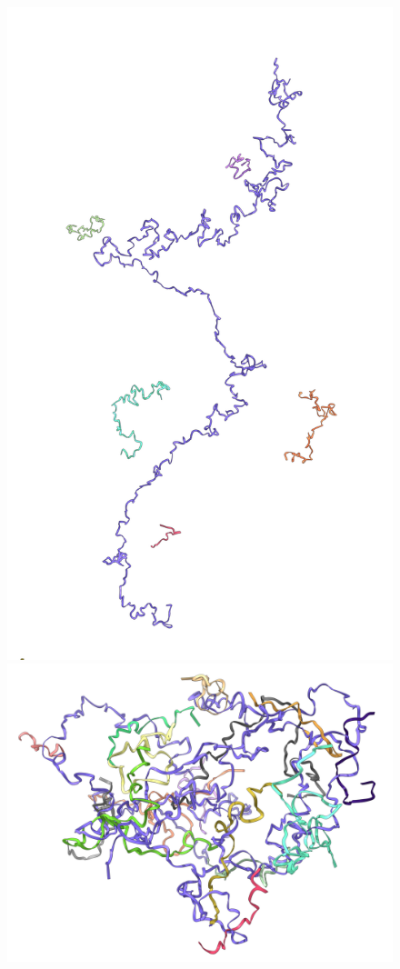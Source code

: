 \begin{figure}
    \centering\includegraphics[width=\textwidth/5]{figures/melt/melted.png}\hfill
    \centering\includegraphics[width=\textwidth/3]{figures/melt/intermediate1.png}\hfill

\end{figure}
